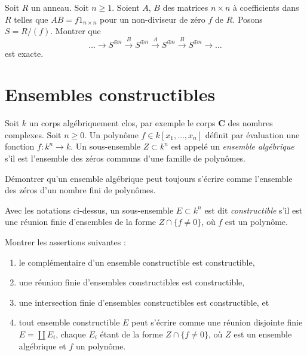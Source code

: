 \begin{exercise}
\label{exercise-periodic-resolution}
Soit $R$ un anneau. Soit $n \geq 1$. Soient $A$, $B$ des matrices $n \times n$ à
coefficients dans $R$ telles que $AB = f 1_{n \times n}$
pour un non-diviseur de zéro $f$ de $R$. Posons $S = R/(f)$. Montrer que
$$
\ldots \to
S^{\oplus n} \xrightarrow{B}
S^{\oplus n} \xrightarrow{A}
S^{\oplus n} \xrightarrow{B}
S^{\oplus n} \to \ldots
$$
est exacte.
\end{exercise}







\section{Ensembles constructibles}
\label{section-constructible}

\noindent
Soit $k$ un corps algébriquement clos, par exemple le corps $\mathbf{C}$
des nombres complexes. Soit $n \geq 0$. Un polynôme $f \in k[x_1, \ldots, x_n]$
définit par évaluation une fonction $f : k^n \to k$. Un sous-ensemble $Z \subset k^n$
est appelé un {\it ensemble algébrique} s'il est l'ensemble des zéros communs d'une
famille de polynômes.

\begin{exercise}
\label{exercise-finite-nr-equations}
Démontrer qu'un ensemble algébrique peut toujours s'écrire comme l'ensemble des zéros
d'un nombre fini de polynômes.
\end{exercise}

\noindent
Avec les notations ci-dessus, un sous-ensemble $E \subset k^n$ est dit
{\it constructible} s'il est une réunion finie d'ensembles de la forme
$Z \cap \{f \not = 0\}$, où $f$ est un polynôme.

\begin{exercise}
\label{exercise-constructible-classical}
Montrer les assertions suivantes :
\begin{enumerate}
\item le complémentaire d'un ensemble constructible est constructible,
\item une réunion finie d'ensembles constructibles est constructible,
\item une intersection finie d'ensembles constructibles est constructible, et
\item tout ensemble constructible $E$ peut s'écrire comme une réunion disjointe finie
$E = \coprod E_i$, chaque $E_i$ étant de la forme $Z \cap \{f \not = 0\}$,
où $Z$ est un ensemble algébrique et $f$ un polynôme.
\end{enumerate}
\end{exercise}

